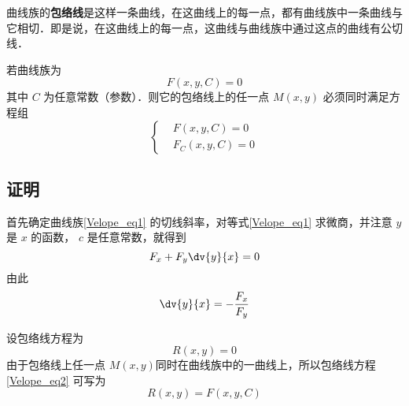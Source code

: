 
曲线族的\textbf{包络线}是这样一条曲线，在这曲线上的每一点，都有曲线族中一条曲线与它相切．即是说，在这曲线上的每一点，这曲线与曲线族中通过这点的曲线有公切线．

若曲线族为 
\begin{equation}\label{Velope_eq1}
F(x,y,C)=0
\end{equation}
其中 $C$ 为任意常数（参数）．则它的包络线上的任一点 $M(x,y)$ 必须同时满足方程组
\begin{equation}
\left\{\begin{aligned}
&F(x,y,C)=0\\
&F_C(x,y,C)=0
\end{aligned}\right.
\end{equation}
\subsection{证明}
首先确定曲线族\autoref{Velope_eq1} 的切线斜率，对等式\autoref{Velope_eq1} 求微商，并注意 $y$ 是 $x$ 的函数， $c$ 是任意常数，就得到
\begin{equation}
F_x+F_y\dv{y}{x}=0
\end{equation}
由此
\begin{equation}
\dv{y}{x}=-\frac{F_x}{F_y}
\end{equation}

设包络线方程为
\begin{equation}\label{Velope_eq2}
R(x,y)=0
\end{equation}
由于包络线上任一点 $M(x,y)$同时在曲线族中的一曲线上，所以包络线方程\autoref{Velope_eq2} 可写为
\begin{equation}
R(x,y)=F(x,y,C)
\end{equation}
